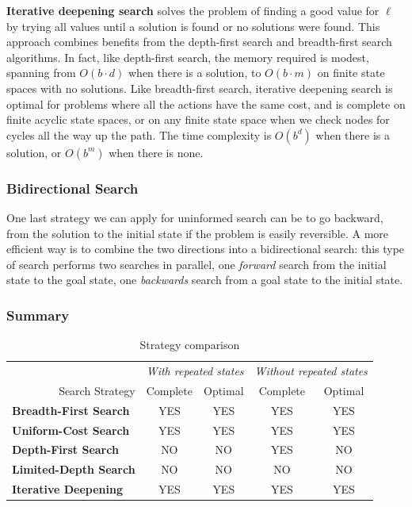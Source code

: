 \documentclass{article}
\begin{document}
\textbf{Iterative deepening search} solves the problem of finding a good value for $\ell$ by trying all values until a solution is found or no solutions were found. This approach combines benefits from the depth-first search and breadth-first search algorithms. In fact, like depth-first search, the memory required is modest, spanning from $O(b\cdot d)$ when there is a solution, to $O(b\cdot m)$ on finite state spaces with no solutions. Like breadth-first search, iterative deepening search is optimal for problems where all the actions have the same cost, and is complete on finite acyclic state spaces, or on any finite state space when we check nodes for cycles all the way up the path. The time complexity is $O(b^d)$ when there is a solution, or $O(b^m)$ when there is none.

\subsubsection{Bidirectional Search}
One last strategy we can apply for uninformed search can be to go backward, from the solution to the initial state if the problem is easily reversible. A more efficient way is to combine the two directions into a bidirectional search: this type of search performs two searches in parallel, one \textit{forward} search from the initial state to the goal state, one \textit{backwards} search from a goal state to the initial state.

\subsubsection{Summary}

\begin{table}[h]
    \begin{tabular}{lcccc}
        \multicolumn{1}{l}{} & \multicolumn{2}{c}{\textit{With repeated states}} & \multicolumn{2}{c}{\textit{Without repeated states}} \\
        \multicolumn{1}{r||}{Search Strategy} & \multicolumn{1}{c|}{Complete} & \multicolumn{1}{c|}{Optimal} & \multicolumn{1}{c|}{Complete} & Optimal \\ \hline \hline
        \multicolumn{1}{l||}{\textbf{Breadth-First Search}} & \multicolumn{1}{c|}{YES} & \multicolumn{1}{c|}{YES} & \multicolumn{1}{c|}{YES} & YES \\ \hline
        \multicolumn{1}{l||}{\textbf{Uniform-Cost Search}} & \multicolumn{1}{c|}{YES} & \multicolumn{1}{c|}{YES} & \multicolumn{1}{c|}{YES} & YES \\ \hline
        \multicolumn{1}{l||}{\textbf{Depth-First Search}} & \multicolumn{1}{c|}{NO} & \multicolumn{1}{c|}{NO} & \multicolumn{1}{c|}{YES} & NO \\ \hline
        \multicolumn{1}{l||}{\textbf{Limited-Depth Search}} & \multicolumn{1}{c|}{NO} & \multicolumn{1}{c|}{NO} & \multicolumn{1}{c|}{NO} & NO \\ \hline
        \multicolumn{1}{l||}{\textbf{Iterative Deepening}} & \multicolumn{1}{c|}{YES} & \multicolumn{1}{c|}{YES} & \multicolumn{1}{c|}{YES} & YES
    \end{tabular}
    \caption{Strategy comparison}
    \label{tab:strategy_comparison}
\end{table}
\end{document}
